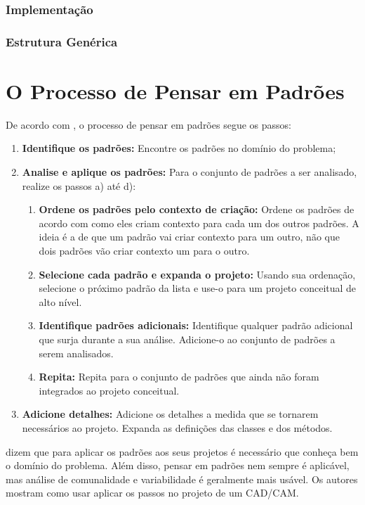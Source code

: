 \documentclass[
	11pt,				%
	openright,
	twoside,			%
	a4paper,			%
	english,			%
	french,
	brazil,				%
	sumario=tradicional
	]{abntex2}
\begin{document}
\subsubsection{Implementação}
\subsubsection{Estrutura Genérica}

\section{O Processo de Pensar em Padrões}

De acordo com , o processo de pensar em padrões segue os passos:
\begin{enumerate}
\item \textbf{Identifique os padrões:} Encontre os padrões no domínio do problema;
\item \textbf{Analise e aplique os padrões:} Para o conjunto de padrões a ser analisado, realize os passos a) até d):
\begin{enumerate}
\item \textbf{Ordene os padrões pelo contexto de criação:} Ordene os padrões de acordo com como eles criam contexto para cada um dos outros padrões. A ideia é a de que um padrão vai criar contexto para um outro, não que dois padrões vão criar contexto um para o outro.
\item \textbf{Selecione cada padrão e expanda o projeto:} Usando sua ordenação, selecione o próximo padrão da lista e use-o para um projeto conceitual de alto nível.
\item \textbf{Identifique padrões adicionais:} Identifique qualquer padrão adicional que surja durante a sua análise. Adicione-o ao conjunto de padrões a serem analisados.
\item \textbf{Repita:} Repita para o conjunto de padrões que ainda não foram integrados ao projeto conceitual.
\end{enumerate}
\item \textbf{Adicione detalhes:} Adicione os detalhes a medida que se tornarem necessários ao projeto. Expanda as definições das classes e dos métodos.
\end{enumerate}

 dizem que para aplicar os padrões aos seus projetos é necessário que conheça bem o domínio do problema. Além disso, pensar em padrões nem sempre é aplicável, mas análise de comunalidade e variabilidade é geralmente mais usável. Os autores mostram como usar aplicar os passos no projeto de um CAD/CAM.
\end{document}
